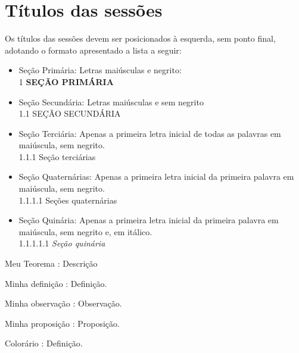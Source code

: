 \documentclass{modelo}
\begin{document}
\section{Títulos das sessões} Os títulos das sessões devem ser posicionados à esquerda, sem ponto final, adotando o formato apresentado a lista a seguir:  
\begin{itemize}
 \item Seção Primária: Letras maiúsculas e negrito: \\ 
  1 \textbf{SEÇÃO PRIMÁRIA}\\
\item Seção Secundária: Letras maiúsculas e sem negrito \\ 
  1.1 SEÇÃO SECUNDÁRIA \\ 
\item Seção Terciária: Apenas a primeira letra inicial de todas as palavras em maiúscula, sem negrito. \\  
  1.1.1 Seção terciárias
\item Seção Quaternárias: Apenas a primeira letra inicial da primeira palavra em maiúscula, sem negrito. \\ 
  1.1.1.1 Seções quaternárias \\ 
\item Seção Quinária:  Apenas a primeira letra inicial da primeira palavra em maiúscula, sem negrito e, em itálico. \\ 
  1.1.1.1.1 \textit{Seção quinária}
\end{itemize}  

  
\begin{teorema}
\item[Meu Teorema]: Descrição
\end{teorema} 
 
\begin{defi}
	\item[Minha definição]: Definição.
\end{defi}   

\begin{obs}
	\item[Minha observação]: Observação.
\end{obs}  

\begin{prop}
	\item[Minha proposição]: Proposição.
\end{prop}  
 
\begin{cor}
	\item[Colorário]: Definição.
\end{cor} 
  
\end{document}

